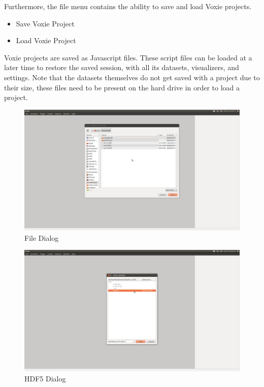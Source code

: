 \medskip

Furthermore, the file menu contains the ability to save and load Voxie projects.

\begin{itemize}
  \item{Save Voxie Project}
  \item{Load Voxie Project}
\end{itemize}

Voxie projects are saved as Javascript files. These script files can be loaded at a 
later time to restore the saved session, with all its datasets, visualizers, and settings.
Note that the datasets themselves do not get saved with a project due to their size, 
these files need to be present on the hard drive in order to load a project.


\begin{figure}[!htbp]
  \centering
  \includegraphics[width=1.0\textwidth]{img/file-dialog.png}
  \caption{File Dialog}
  \label{file-dialog}
\end{figure}

\begin{figure}[!htbp]
  \centering
  \includegraphics[width=1.0\textwidth]{img/hdf5-dialog.png}
  \caption{HDF5 Dialog}
  \label{hdf5-dialog}
\end{figure}

